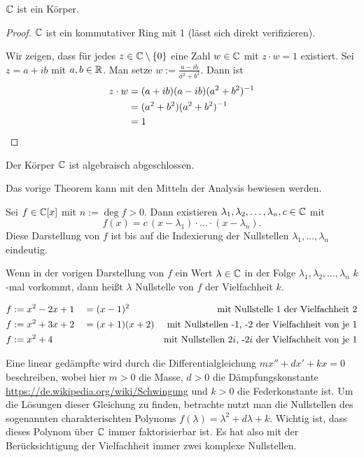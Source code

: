 \begin{propn}
	$ \mathbb C $ ist ein Körper.
\end{propn}
\begin{proof}
	$ \mathbb C $ ist ein kommutativer Ring mit 1 (lässt sich direkt verifizieren).

	Wir zeigen, dass für jedes $ z \in \mathbb C\setminus\{0\} $ eine Zahl $ w \in \mathbb C $ mit $ z \cdot w = 1 $ existiert. Sei $ z = a+ib $ mit $ a,b \in \mathbb R $. Man setze $ w := \frac{a-ib}{a^2+b^2} $. Dann ist
	\begin{align*}
		z \cdot w &= (a+ib)(a-ib)(a^2+b^2)^{-1} \\
			&= (a^2 + b^2)(a^2+b^2)^{-1} \\
			&= 1 \qedhere
	\end{align*}
\end{proof}
 
 \begin{thm}
 	Der Körper $\mathbb C$ ist algebraisch abgeschlossen. 
 \end{thm} 
Das vorige Theorem kann mit den Mitteln der Analysis bewiesen werden. 

\begin{klr}
	Sei $ f \in \mathbb C[x] $ mit $ n := \deg f > 0 $. Dann existieren $ \lambda_1, \lambda_2, \ldots, \lambda_n, c \in \mathbb C $ mit
	\begin{equation}
		f(x) = c \, (x-\lambda_1) \cdot \ldots \cdot (x - \lambda_n).
	\end{equation}
Diese Darstellung von $f$ ist bis auf die Indexierung der Nullstellen $\lambda_1,\ldots,\lambda_n$ eindeutig. 
\end{klr}

\begin{bem}
	Wenn in der vorigen Darstellung von $f$ ein Wert $ \lambda \in \mathbb C $ in der Folge $ \lambda_1, \lambda_2, \ldots, \lambda_n $ $ k $-mal vorkommt, dann heißt $ \lambda $ Nullstelle von $ f $ der Vielfachheit $ k $.
\end{bem}

\begin{bsp}
\begin{align*}
	f &:= x^2 -2x +1 &&= (x-1)^2 & \text{mit Nullstelle 1 der Vielfachheit 2} \\
	f &:= x^2 +3x +2 &&= (x+1)(x+2) & \text{mit Nullstellen -1, -2 der Vielfachheit von je 1} \\
	f &:= x^2 +4 && & \text{mit Nullstellen 2$ i $, -2$ i $ der Vielfachheit von je 1}
\end{align*}
\end{bsp}

\begin{bsp} 
	Eine linear gedämpfte wird durch die Differentialgleichung $m x'' + d x' + k x = 0$ beschreiben, wobei hier $m>0$ die Masse, $d >0$ die Dämpfungskonstante 
	\url{https://de.wikipedia.org/wiki/Schwingung} und $k >0$ die Federkonstante ist. Um die Lösungen dieser Gleichung zu finden, betrachte nutzt man die Nullstellen des sogenannten charakterischten Polynoms $f(\lambda) = \lambda^2 + d \lambda + k$. Wichtig ist, dass dieses Polynom über $\mathbb C$ immer faktorisierbar ist. Es hat also mit der Berücksichtigung der Vielfachheit immer zwei komplexe Nullstellen. 
\end{bsp} 
